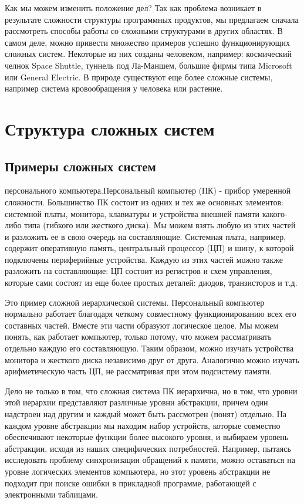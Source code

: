 \documentclass[11pt]{article}
\begin{document}
Как мы можем изменить положение дел? Так как проблема возникает в результате сложности структуры программных продуктов, мы предлагаем сначала рассмотреть способы работы со сложными структурами в других областях. В самом деле, можно привести множество примеров успешно функционирующих сложных систем. Некоторые из них созданы человеком, например: космический челнок Space Shuttle, туннель под Ла-Маншем, большие фирмы типа Microsoft или General Electric. В природе существуют еще более сложные системы, например система кровообращения у человека или растение. 

\section{Структура сложных систем }
\subsection{Примеры сложных систем}
 персонального компьютера.\rm Персональный компьютер (ПК) - прибор умеренной сложности. Большинство ПК состоит из одних и тех же основных элементов: системной платы, монитора, клавиатуры и устройства внешней памяти какого-либо типа (гибкого или жесткого диска). Мы можем взять любую из этих частей и разложить ее в свою очередь на составляющие. Системная плата, например, содержит оперативную память, центральный процессор (ЦП) и шину, к которой подключены периферийные устройства. Каждую из этих частей можно также разложить на составляющие: ЦП состоит из регистров и схем управления, которые сами состоят из еще более простых деталей: диодов, транзисторов и т.д. \bigskip 

Это пример сложной иерархической системы. Персональный компьютер нормально работает благодаря четкому совместному функционированию всех его составных частей. Вместе эти части образуют логическое целое. Мы можем понять, как работает компьютер, только потому, что можем рассматривать отдельно каждую его составляющую. Таким образом, можно изучать устройства монитора и жесткого диска независимо друг от друга. Аналогично можно изучать арифметическую часть ЦП, не рассматривая при этом подсистему памяти. \bigskip 

Дело не только в том, что сложная система ПК иерархична, но в том, что уровни этой иерархии представляют различные уровни абстракции, причем один надстроен над другим и каждый может быть рассмотрен (понят) отдельно. На каждом уровне абстракции мы находим набор устройств, которые совместно обеспечивают некоторые функции более высокого уровня, и выбираем уровень абстракции, исходя из наших специфических потребностей. Например, пытаясь исследовать проблему синхронизации обращений к памяти, можно оставаться на уровне логических элементов компьютера, но этот уровень абстракции не подходит при поиске ошибки в прикладной программе, работающей с электронными таблицами. \bigskip 
\end{document}
